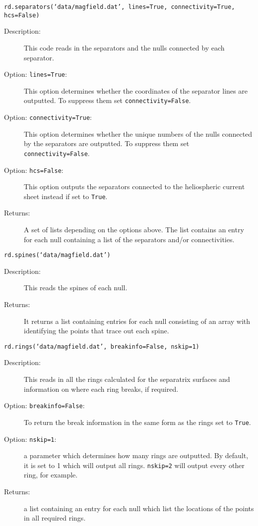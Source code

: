 \documentclass[12pt]{article}
\begin{document}
      \texttt{rd.separators(`data/magfield.dat', lines=True, connectivity=True, hcs=False)}

      \begin{description}
        \item [Description:] This code reads in the separators and the nulls connected by each separator.
        \item [Option: \texttt{lines=True}:] This option determines whether the coordinates of the separator lines are outputted. To suppress them set \texttt{connectivity=False}.
        \item [Option: \texttt{connectivity=True}:] This option determines whether the unique numbers of the nulls connected by the separators are outputted. To suppress them set \texttt{connectivity=False}.
        \item [Option: \texttt{hcs=False}:] This option outputs the separators connected to the heliospheric current sheet instead if set to \texttt{True}.
        \item [Returns:] A set of lists depending on the options above. The list contains an entry for each null containing a list of the separators and/or connectivities.
      \end{description}

      \texttt{rd.spines(`data/magfield.dat')}

      \begin{description}
        \item [Description:] This reads the spines of each null.
        \item [Returns:] It returns a list containing entries for each null consisting of an array with identifying the points that trace out each spine.
      \end{description}

      \texttt{rd.rings(`data/magfield.dat', breakinfo=False, nskip=1)}

      \begin{description}
        \item [Description:] This reads in all the rings calculated for the separatrix surfaces and information on where each ring breaks, if required.
        \item [Option: \texttt{breakinfo=False}:] To return the break information in the same form as the rings set to \texttt{True}.
        \item [Option: \texttt{nskip=1}:] a parameter which determines how many rings are outputted. By default, it is set to 1 which will output all rings. \texttt{nskip=2} will output every other ring, for example.
        \item [Returns:] a list containing an entry for each null which list the locations of the points in all required rings.
      \end{description}
\end{document}
